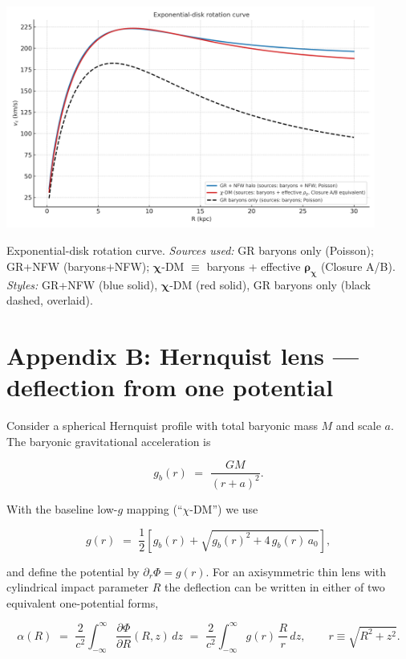 \documentclass[
]{article}
\begin{document}
\includegraphics[width=4.78333in,height=2.87in,alt={A graph of a graph of a number of different colored lines AI-generated content may be incorrect.}]{letter_media/media/image5.png}

Exponential-disk rotation curve. \emph{Sources used:} GR baryons only
(Poisson); GR+NFW (baryons+NFW); \(\mathbf{\chi}\)-DM
\(\mathbf{\equiv}\) baryons + effective
\(\mathbf{\rho}_{\mathbf{\chi}}\) (Closure A/B). \emph{Styles:} GR+NFW
(blue solid), \(\mathbf{\chi}\)-DM (red solid), GR baryons only (black
dashed, overlaid).

\section{Appendix B: Hernquist lens --- deflection from one
potential}\label{appendix-b-hernquist-lens-deflection-from-one-potential}

Consider a spherical Hernquist profile with total baryonic mass \(M\)
and scale \(a\). The baryonic gravitational acceleration is

\[g_{b}(r)\mspace{6mu} = \mspace{6mu}\frac{GM}{(r + a)^{2}}.\]

With the baseline low-\(g\) mapping (``\(\chi\)-DM'') we use

\[g(r)\mspace{6mu} = \mspace{6mu}\frac{1}{2}\left\lbrack g_{b}(r) + \sqrt{g_{b}(r)^{2} + 4\, g_{b}(r)\, a_{0}} \right\rbrack,\]

and define the potential by \(\partial_{r}\Phi = g(r)\). For an
axisymmetric thin lens with cylindrical impact parameter \(R\) the
deflection can be written in either of two equivalent one-potential
forms,

\[\alpha(R)\mspace{6mu} = \mspace{6mu}\frac{2}{c^{2}}\int_{- \infty}^{\infty}\frac{\partial\Phi}{\partial R}(R,z)\, dz\mspace{6mu} = \mspace{6mu}\frac{2}{c^{2}}\int_{- \infty}^{\infty}g(r)\,\frac{R}{r}\, dz,\quad\quad r \equiv \sqrt{R^{2} + z^{2}}.\]
\end{document}

